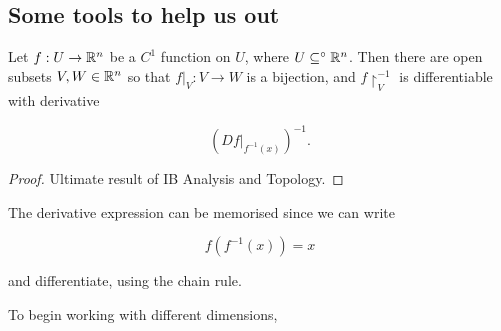\documentclass[11pt]{scrartcl}
\begin{document}
\subsection{Some tools to help us out}

\begin{theorem}
Let $f:U \rightarrow \mathbb R^n$ be a $C^1$ function on $U$, where $U \subseteq^\circ \mathbb R^n$. Then there are open subsets $V, W \in \mathbb R^n$ so that $f|_V : V \rightarrow W$ is a bijection, and $f\upharpoonright_V^{-1}$ is differentiable with derivative

\begin{equation}
    (Df|_{f^{-1}(x)})^{-1}.
\end{equation}
\begin{proof}
Ultimate result of IB Analysis and Topology.
\end{proof}
\end{theorem}

\begin{remark}
The derivative expression can be memorised since we can write

\begin{equation}
    f(f^{-1}(x)) = x
\end{equation}

and differentiate, using the chain rule.
\end{remark}

To begin working with different dimensions,
\end{document}
